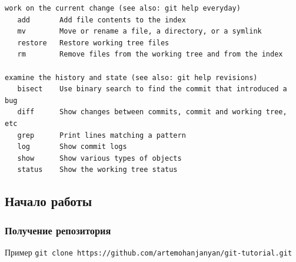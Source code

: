 \documentclass[pdf,russian]{beamer}
\begin{document}
\begin{frame}[fragile]
\begin{Verbatim}[fontsize=\relsize{-3}]
work on the current change (see also: git help everyday)
   add       Add file contents to the index
   mv        Move or rename a file, a directory, or a symlink
   restore   Restore working tree files
   rm        Remove files from the working tree and from the index

examine the history and state (see also: git help revisions)
   bisect    Use binary search to find the commit that introduced a bug
   diff      Show changes between commits, commit and working tree, etc
   grep      Print lines matching a pattern
   log       Show commit logs
   show      Show various types of objects
   status    Show the working tree status
    \end{Verbatim}
\end{frame}

\subsection{Начало работы}


\begin{frame}
    \frametitle{Получение репозитория}
    \begin{exampleblock}{Пример}
        \texttt{git clone https://github.com/artemohanjanyan/git-tutorial.git}
    \end{exampleblock}
\end{frame}
\end{document}
